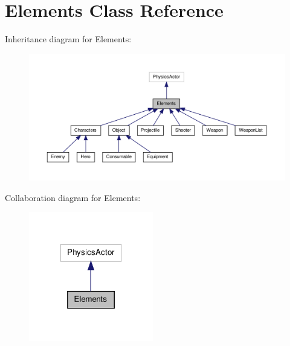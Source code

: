 \hypertarget{class_elements}{\section{Elements Class Reference}
\label{class_elements}
}


Inheritance diagram for Elements\-:\nopagebreak
\begin{figure}[H]
\begin{center}
\leavevmode
\includegraphics[width=350pt]{class_elements__inherit__graph}
\end{center}
\end{figure}


Collaboration diagram for Elements\-:\nopagebreak
\begin{figure}[H]
\begin{center}
\leavevmode
\includegraphics[width=154pt]{class_elements__coll__graph}
\end{center}
\end{figure}
